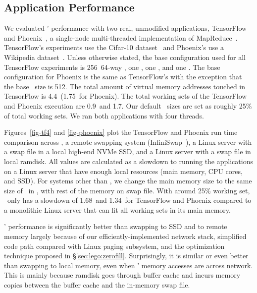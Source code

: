 
\subsection{Application Performance}
\label{sec:appresults}
We evaluated \lego' performance with two real, unmodified applications, 
TensorFlow~\cite{TensorFlow} and Phoenix~\cite{Ranger07-HPCA}, a single-node multi-threaded implementation of MapReduce~\cite{DeanEtAl04-MapReduce}.
TensorFlow's experiments use the Cifar-10 dataset~\cite{CIFAR-DS} and Phoenix's use a Wikipedia dataset~\cite{Wiki-DS}.
Unless otherwise stated, the base configuration used for all TensorFlow experiments
is 256\MB\ 64-way \excache, one \pcomponent, one \mcomponent, and one \scomponent.
The base configuration for Phoenix is the same as TensorFlow's with the exception that the base \excache\ size is 512\MB.
The total amount of virtual memory addresses touched in TensorFlow is 4.4\GB\ (1.75\GB\ for Phoenix).
The total working sets of the TensorFlow and Phoenix execution are 0.9\GB\ and 1.7\GB.
Our default \excache\ sizes are set as roughly 25\% of total working sets.
We ran both applications with four threads.

Figures~\ref{fig-tf4} and \ref{fig-phoenix} plot the TensorFlow and Phoenix run time comparison across 
\lego, a remote swapping system (InfiniSwap~\cite{GU17-NSDI}), 
a Linux server with a swap file in a local high-end NVMe SSD, 
and a Linux server with a swap file in local ramdisk.
All values are calculated as a slowdown to running the applications on a Linux server that have enough local resources (main memory, CPU cores, and SSD).
For systems other than \lego, we change the main memory size to the same size of \excache\ in \lego, with rest of the memory on swap file. 
With around 25\% working set, \lego\ only has a slowdown of 1.68\x\ and 1.34\x\ for TensorFlow and Phoenix
compared to a monolithic Linux server that can fit all working sets in its main memory.

\lego' performance is significantly better than swapping to SSD and to remote memory 
largely because of our efficiently-implemented network stack, simplified code path compared with Linux paging subsystem,
and the optimization technique proposed in \S\ref{sec:lego:zerofill}.
Surprisingly, it is similar or even better than swapping to local memory, even when \lego' memory accesses are across network.
This is mainly because ramdisk goes through buffer cache and incurs memory copies between the buffer cache and the in-memory swap file.

